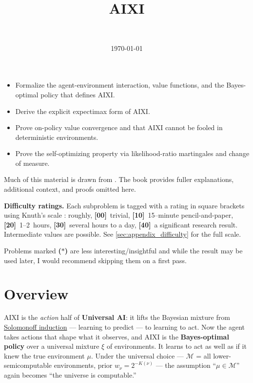 \documentclass[fontsize=11pt, parskip=half]{scrartcl}
\newcommand{\cM}{\mathcal{M}}
\begin{document}
\title{AIXI}
\author{\\ }
\date{\today}
\maketitle

\begin{learningoutcomes}
  \begin{itemize}
    \item Formalize the agent-environment interaction, value functions, and the Bayes-optimal policy that defines AIXI.
    \item Derive the explicit expectimax form of AIXI.
    \item Prove on-policy value convergence and that AIXI cannot be fooled in deterministic environments.
    \item Prove the self-optimizing property via likelihood-ratio martingales and change of measure.
  \end{itemize}
\end{learningoutcomes}

\medskip
\noindent
Much of this material is drawn from \cite{Hutter:24uaibook2}. 
The book provides fuller explanations, additional context, and proofs omitted here.

\medskip
\noindent
\textbf{Difficulty ratings.} Each subproblem is tagged with a rating in square brackets using Knuth's scale \cite{Knuth:73a}: roughly, \textbf{[00]}~trivial, \textbf{[10]}~15--minute pencil-and-paper, \textbf{[20]}~1--2~hours, \textbf{[30]}~several hours to a day, \textbf{[40]}~a significant research result. Intermediate values are possible. See \cref{sec:appendix_difficulty} for the full scale. 

Problems marked \textbf{($\ast$)} are less interesting/insightful and while the result may be used later, I would recommend skipping them on a first pass.


\section*{Overview}

AIXI is the \emph{action} half of \textbf{Universal AI}: it lifts the Bayesian
mixture from \href{/agency/solomonoff-induction}{Solomonoff induction} --- learning
to predict --- to learning to act. Now the agent takes actions that shape what it
observes, and AIXI is the \textbf{Bayes-optimal policy} over a universal mixture
$\xi$ of environments. It learns to act as well as if it knew the true environment
$\mu$. Under the universal choice --- $\cM$ = all lower-semicomputable environments,
prior $w_\nu = 2^{-K(\nu)}$ --- the assumption ``$\mu \in \cM$'' again becomes
``the universe is computable.''
\end{document}
